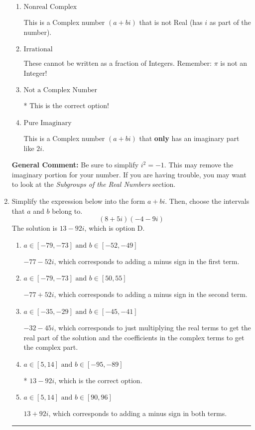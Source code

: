\documentclass{extbook}[14pt]
\newcommand{\litem}[1]{\item #1

\rule{\textwidth}{0.4pt}}
\begin{document}
\begin{enumerate}
{\begin{enumerate}[label=\Alph*.]
These are numbers that can be written as fraction of Integers (e.g., -2/3 + 5)
\item \( \text{Nonreal Complex} \)

This is a Complex number $(a+bi)$ that is not Real (has $i$ as part of the number).
\item \( \text{Irrational} \)

These cannot be written as a fraction of Integers. Remember: $\pi$ is not an Integer!
\item \( \text{Not a Complex Number} \)

* This is the correct option!
\item \( \text{Pure Imaginary} \)

This is a Complex number $(a+bi)$ that \textbf{only} has an imaginary part like $2i$.
\end{enumerate}

\textbf{General Comment:} Be sure to simplify $i^2 = -1$. This may remove the imaginary portion for your number. If you are having trouble, you may want to look at the \textit{Subgroups of the Real Numbers} section.
}
\litem{
Simplify the expression below into the form $a+bi$. Then, choose the intervals that $a$ and $b$ belong to.
\[ (8 + 5 i)(-4 - 9 i) \]
The solution is \( 13 - 92 i \), which is option D.\begin{enumerate}[label=\Alph*.]
\item \( a \in [-79, -73] \text{ and } b \in [-52, -49] \)

 $-77 - 52 i$, which corresponds to adding a minus sign in the first term.
\item \( a \in [-79, -73] \text{ and } b \in [50, 55] \)

 $-77 + 52 i$, which corresponds to adding a minus sign in the second term.
\item \( a \in [-35, -29] \text{ and } b \in [-45, -41] \)

 $-32 - 45 i$, which corresponds to just multiplying the real terms to get the real part of the solution and the coefficients in the complex terms to get the complex part.
\item \( a \in [5, 14] \text{ and } b \in [-95, -89] \)

* $13 - 92 i$, which is the correct option.
\item \( a \in [5, 14] \text{ and } b \in [90, 96] \)

 $13 + 92 i$, which corresponds to adding a minus sign in both terms.
\end{enumerate}

}
\end{enumerate}
\end{document}
